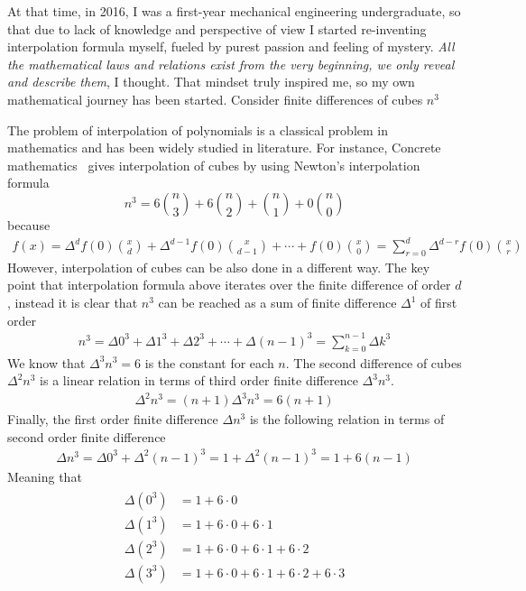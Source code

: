 At that time, in 2016, I was a first-year mechanical engineering undergraduate,
so that due to lack of knowledge and perspective of view I started re-inventing interpolation
formula myself, fueled by purest passion and feeling of mystery.
\textit{All the mathematical laws and relations exist from the very beginning, we only reveal and describe them},
I thought.
That mindset truly inspired me, so my own mathematical journey has been started.
Consider finite differences of cubes $n^3$

The problem of interpolation of polynomials is a classical problem in mathematics and has been widely studied in literature.
For instance, Concrete mathematics~\cite{graham1989concrete} gives interpolation of cubes by using
Newton's interpolation formula
\[
    n^3 = 6 \binom{n}{3} + 6 \binom{n}{2} + \binom{n}{1} + 0 \binom{n}{0}
\]
because
\begin{align*}
    f(x) = \Delta^{d} f(0) \binom{x}{d} +  \Delta^{d-1} f(0) \binom{x}{d-1} + \cdots + f(0) \binom{x}{0}
    = \sum_{r=0}^{d} \Delta^{d-r} f(0) \binom{x}{r}
\end{align*}
However, interpolation of cubes can be also done in a different way.
The key point that interpolation formula above iterates over the finite difference of order $d$,
instead it is clear that $n^3$ can be reached as a sum of finite difference $\Delta^1$ of first order
\begin{align*}
    n^3 = \Delta 0^3 + \Delta 1^3 + \Delta 2^3 + \cdots + \Delta (n-1)^3 = \sum_{k=0}^{n-1} \Delta k^3
\end{align*}
We know that $\Delta^3 n^3 = 6$ is the constant for each $n$.
The second difference of cubes $\Delta^2 n^3$ is a linear relation in terms of third order finite difference
$\Delta^3 n^3$.
\begin{align*}
    \Delta^2 n^3 = (n+1) \Delta^3 n^3 = 6(n+1)
\end{align*}
Finally, the first order finite difference $\Delta n^3$ is the following relation in terms of second
order finite difference
\begin{align*}
    \Delta n^3 = \Delta 0^3 + \Delta^2 (n-1)^3 = 1 + \Delta^2 (n-1)^3 = 1 + 6(n-1)
\end{align*}
Meaning that
\begin{align}
    \label{eq:cubes_interpolation}
    \begin{split}
        \Delta(0^3) &= 1+6 \cdot 0 \\
        \Delta(1^3) &= 1+6\cdot0+6\cdot1 \\
        \Delta(2^3) &= 1+6\cdot0+6\cdot1+6\cdot2 \\
        \Delta(3^3) &= 1+6\cdot0+6\cdot1+6\cdot2+6\cdot3
    \end{split}
\end{align}
